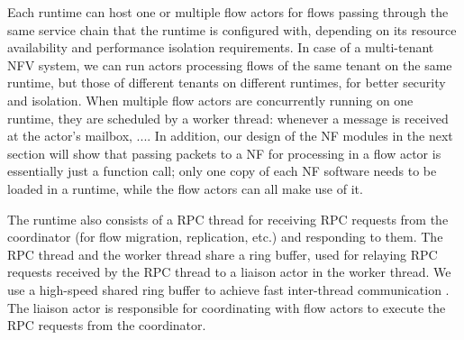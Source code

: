 Each runtime can host one or multiple flow actors for flows passing through the same service chain that the runtime is configured with, depending on its resource availability and performance isolation requirements. In case of a multi-tenant NFV system, we can run actors processing flows of the same tenant on the same runtime, but those of different tenants on different runtimes, for better security and isolation. When multiple flow actors are concurrently running on one runtime, they are scheduled by a worker thread:  whenever a message is received at the actor's mailbox, .... In addition, our design of the NF modules in the next section will show that passing packets to a NF for processing in a flow actor is essentially just a function call; only one copy of each NF software needs to be loaded in a runtime, while the flow actors can all make use of it. %



The runtime also consists of a RPC thread for receiving RPC requests from the coordinator (for flow migration, replication, etc.) and responding to them. The RPC thread and the worker thread share a ring buffer, used for relaying RPC requests received by the RPC thread to a liaison actor in the worker thread. We use a high-speed shared ring buffer to achieve fast inter-thread communication . The liaison actor is responsible for coordinating with flow actors to execute the RPC requests from the coordinator. %





